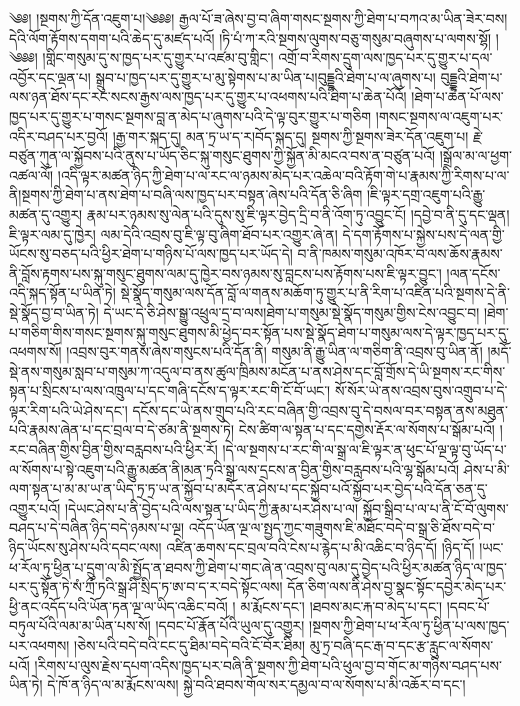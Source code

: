 ༄༅། །སྔགས་ཀྱི་དོན་འཇུག་པ།༄༅༅། རྒྱལ་པོ་ཟ་ཞེས་བྱ་བ་ཞིག་གསང་སྔགས་ཀྱི་ཐེག་པ་བཀའ་མ་ཡིན་ཟེར་བས། དེའི་ལོག་རྟོགས་དགག་པའི་ཆེད་དུ་མཛད་པའོ། །ཏི་པཾ་ཀ་རའི་སྔགས་ལུགས་བཅུ་གསུམ་བཞུགས་པ་ལགས་སྷོ། ། ༄༅༅། །གླིང་གསུམ་དུ་ས་ཁྱད་པར་དུ་གྱུར་པ་འཛམ་བུ་གླིང་། འགྲོ་བ་རིགས་དྲུག་ལས་ཁྱད་པར་དུ་གྱུར་པ་དལ་འབྱོར་དང་ལྡན་པ། སྒྲུབ་པ་ཁྱད་པར་དུ་གྱུར་པ་མུ་སྟེགས་པ་མ་ཡིན་པ།བུདྡྷའི་ཐེག་པ་ལ་ཞུགས་པ། བུདྡྷའི་ཐེག་པ་ལས་ཉན་ཐོས་དང་རང་སངས་རྒྱས་ལས་ཁྱད་པར་དུ་གྱུར་པ་འཕགས་པའི་ཐེག་པ་ཆེན་པོའོ། །ཐེག་པ་ཆེན་པོ་ལས་ཁྱད་པར་དུ་གྱུར་པ་གསང་སྔགས་བླ་ན་མེད་པ་ཞུགས་པའི་དེ་ལྟ་བུར་གྱུར་པ་གཅིག །གསང་སྔགས་ལ་འཇུག་པར་འདིར་བཤད་པར་བྱའོ། །རྒྱ་གར་སྐད་དུ། མན་ཏྲ་ཡ་ད་ར།བོད་སྐད་དུ། སྔགས་ཀྱི་སྔགས་ཟེར་དོན་འཇུག་པ། རྗེ་བཙུན་ཀུན་ལ་སྐྱོབས་པའི་ནུས་པ་ཡོད་ཅིང་སྐུ་གསུང་ཐུགས་ཀྱི་སྐྱོན་མི་མངའ་བས་ན་བཙུན་པའོ། །སྒྲོལ་མ་ལ་ཕྱག་འཚལ་ལོ། །འདི་ལྟར་མཚན་ཉིད་ཀྱི་ཐེག་པ་ལ་རང་ལ་ཉམས་མེད་པར་འཆེལ་བའི་རྟོག་གེ་པ་རྣམས་ཀྱི་རིགས་པ་ལ་ནི།སྔགས་ཀྱི་ཐེག་པ་ནས་ཐེག་པ་བཞི་ལས་ཁྱད་པར་བསྟན་ཞེས་པའི་དོན་ཅི་ཞིག །ཇི་ལྟར་དགྲ་འཇུག་པའི་རྒྱུ་མཚན་དུ་འགྱུར། རྣམ་པར་ཉམས་སུ་ལེན་པའི་དུས་སུ་ཇི་ལྟར་བྱེད་དྲི་བ་ནི་འོག་ཏུ་འབྱུང་ངོ། །དབྱེ་བ་ནི་དུ་དང་ལྡན། ཇི་ལྟར་ལམ་དུ་ཁྱེར། ལམ་དེའི་འབྲས་བུ་ཇི་ལྟ་བུ་ཞིག་ཐོབ་པར་འགྱུར་ཞེ་ན། དེ་དག་རྟོགས་པ་སྐྱེས་པས་དེ་ལན་གྱི་ཡོངས་སུ་བཅད་པའི་ཕྱིར་ཐེག་པ་གཉིས་པོ་ལས་ཁྱད་པར་ཡོད་དེ། བ་ནི་ཁམས་གསུམ་འཁོར་བ་ལས་ཆོས་རྣམས་ནི་བློས་རྟགས་པས་སྐུ་གསུང་ཐུགས་ལམ་དུ་ཁྱེར་བས་ཉམས་སུ་བླངས་པས་རྟོགས་པས་ཇི་ལྟར་བྱུང་། །ལན་དངོས་འདི་སྐད་སྟོན་པ་ཡིན་ཏེ། སྡེ་སྣོད་གསུམ་ལས་དོན་བློ་ལ་གནས་མཆོག་ཏུ་གྱུར་པ་ནི་རིག་པ་འཛིན་པའི་སྔགས་དེ་ནི་སྡེ་སྣོད་བྱ་བ་ཡིན་ཏེ། དེ་ཡང་དེ་ཅི་ཤེས་སྒྱུ་འཕྲུལ་དྲ་བ་ལས།ཐེག་པ་གསུམ་སྡེ་སྣོད་གསུམ་གྱིས་ངེས་འབྱུང་བ། །ཐེག་པ་གཅིག་གིས་གསང་སྔགས་སྐུ་གསུང་ཐུགས་མི་ཕྱེད་བར་སྟོན་པས་སྡེ་སྣོད་ཐེག་པ་གསུམ་ལས་དེ་ལྟར་ཁྱད་པར་དུ་འཕགས་སོ། །འབྲས་བུར་གནས་ཞེས་གསུངས་པའི་དོན་ནི། གསུམ་ནི་རྒྱུ་ཡིན་ལ་གཅིག་ནི་འབྲས་བུ་ཡིན་ནོ། །མདོ་སྡེ་ནས་གསུམ་སླབ་པ་གསུམ་ཀ་འདུལ་བ་ནས་ཚུལ་ཁྲིམས་མངོན་པ་ནས་ཤེས་དང་བློ་གྲོས་དེ་ཡི་སྔགས་རང་གིས་སྟན་པ་སྲིངས་པ་ལས་འཁྲུལ་པ་དང་གཞི་དངོས་ད་ལྟར་རང་གི་ངོ་བོ་ཡང་། སོ་སོར་ཡེ་ནས་འབྲས་བུས་འགྲུབ་པ་དེ་ལྟར་རིག་པའི་ཡེ་ཤེས་དང་། དངོས་དང་ཡེ་ནས་གྲུབ་པའི་རང་བཞིན་གྱི་འབྲས་བུ་དེ་བསལ་བར་བསྟན་ནས་མཐུན་པའི་རྣམས་ཞེན་པ་དང་བྲལ་བ་དེ་ཙམ་ནི་སྔགས་ཏེ། ངེས་ཚིག་ལ་སྟན་པ་དང་དགྱེས་རྡོར་ལ་སོགས་པ་སྒོམ་པའོ། །རང་བཞིན་གྱིས་བྱིན་གྱིས་བརླབས་པའི་ཕྱིར་རོ། །དེ་ལ་སྔགས་པ་རང་གི་ལ་སྒྲ་ལ་ཇི་ལྟར་ན་ཕུང་པོ་ལྔ་ལྟ་བུ་ཡོད་པ་ལ་སོགས་པ་སྟེ་འཇུག་པའི་རྒྱུ་མཚན་ནི།མན་ཏྲའི་སྒྲ་ལས་དྲངས་ན་བྱིན་གྱིས་བརླབས་པའི་ལྷ་སྒོམ་པའོ། ཤེས་པ་མི་ལག་སྟན་པ་མ་མ་ཡ་ན་ཡིད་ཏྲ་ཏྲ་ཡ་ན་སྐྱོབ་པ་མདོར་ན་ཤེས་པ་དང་སྐྱོབ་པའོ་སྐྱོབ་པར་བྱེད་པའི་དོན་ཅན་དུ་འགྱུར་པའོ། །དེཡང་ཤེས་པ་ནི་བྱེད་པའི་ལས་སྟན་པ་ཡིད་ཀྱི་རྣམ་པར་ཤེས་པ་ལ། སྐྱོབ་སྒྲིབ་པ་ལ་པ་ནི་ངོ་བོ་ལུགས་བཤད་པ་དེ་བཞིན་ཉིད་བདེ་ཉམས་པ་ལྔ། འདོད་ཡོན་ལྔ་ལ་སྤྱད་ཀྱང་གཟུགས་ཇི་མཐོང་བདེ་བ་སྒྲ་ཅི་ཐོས་བདེ་བ་ཉིད་ཡོངས་སུ་ཤེས་པའི་དབང་ལས། འཛིན་ཆགས་དང་བྲལ་བའི་ངེས་པ་རྙེད་པ་མི་འཆིང་བ་ཉིད་དོ། །ཉིད་དོ། །ཡང་ཕ་རོལ་ཏུ་ཕྱིན་པ་དྲུག་ལ་མི་སྤྱོད་ན་ཐབས་ཀྱི་ཐེག་པ་གང་ཞེ་ན་འབྲས་བུ་ལམ་དུ་བྱེད་པའི་ཕྱིར་མཚན་ཉིད་ལ་ཁྱད་པར་དུ་སྟོན་ཏེ་སཾ་ཀྲྀ་ཏའི་སྒྲ་ཤི་སྲིད་ཏ་ཨ་བ་ད་ར་བདེ་སྟོང་ལས། དོན་ཅིག་ལས་ནི་ཤེས་བྱ་སྣང་སྟོང་དབྱེར་མེད་པར་ཕྱི་ནང་འདོད་པའི་ཡོན་ཏན་ལྔ་ལ་ཡིད་འཆིང་བའོ། ། མ་རྨོངས་དང་། །ཐབས་མང་རྐ་བ་མེད་པ་དང་། །དབང་པོ་བཏུལ་པོའི་ལམ་མ་ཡིན་པས་སོ། །དབང་པོ་རྣོན་པོའི་ཡུལ་དུ་འགྱུར། །སྔགས་ཀྱི་ཐེག་པ་ཕ་རོལ་ཏུ་ཕྱིན་པ་ལས་ཁྱད་པར་འཕགས། །ཅེས་པའི་བདེ་བའི་ངང་དུ་ཐིམ་བདེ་བའི་ངོ་བོར་ཐིམ། མུ་ཏྲ་བཞི་དང་རྒ་བ་དང་རྩ་རླུང་ལ་སོགས་པའོ། །རིགས་པ་ལུས་རྗེས་དཔག་འདིས་ཁྱད་པར་བཞི་ནི་སྔགས་ཀྱི་ཐེག་པའི་ཕུལ་བྱ་བ་གོང་མ་གཉིས་བཤད་པས་ཡིན་ཏེ། དེ་ཁོ་ན་ཉིད་ལ་མ་རྨོངས་ལས། སྐྱེ་བའི་ཐབས་གོལ་སར་དམྱལ་བ་ལ་སོགས་པ་མི་འཆོར་བ་དང་། 